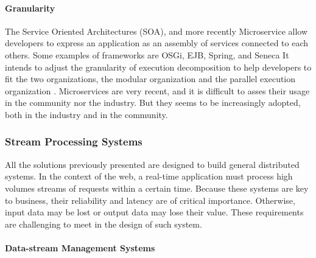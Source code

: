 
\paragraph{Granularity}

The Service Oriented Architectures (SOA), and more recently Microservice\cite{Namiot2014,Fernandez-Villamor2010,Fowler2014,Namiot2014} allow developers to express an application as an assembly of services connected to each others.
Some examples of frameworks are OSGi, EJB, Spring, and Seneca
It intends to adjust the granularity of execution decomposition to help developers to fit the two organizations, the modular organization and the parallel execution organization \cite{Adam2008}.
Microservices are very recent, and it is difficult to asses their usage in the community nor the industry.
But they seems to be increasingly adopted, both in the industry and in the community.




\subsubsection{Stream Processing Systems}

All the solutions previously presented are designed to build general distributed systems.
In the context of the web, a real-time application must process high volumes streams of requests within a certain time.
Because these systems are key to business, their reliability and latency are of critical importance.
Otherwise, input data may be lost or output data may lose their value.
These requirements are challenging to meet in the design of such system.

\paragraph{Data-stream Management Systems}

